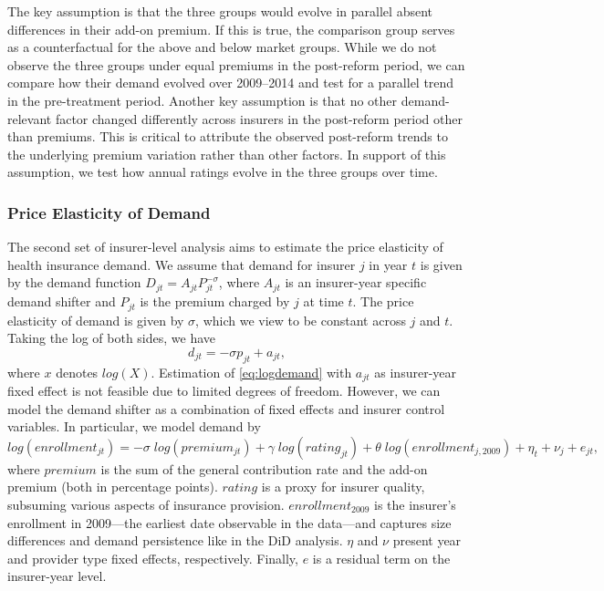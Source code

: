 \documentclass[a4paper, 11pt, english]{article}
\begin{document}
The key assumption is that the three groups would evolve in parallel absent differences in their add-on premium. If this is true, the comparison group serves as a counterfactual for the above and below market groups. While we do not observe the three groups under equal premiums in the post-reform period, we can compare how their demand evolved over 2009--2014 and test for a parallel trend in the pre-treatment period. Another key assumption is that no other demand-relevant factor changed differently across insurers in the post-reform period other than premiums. This is critical to attribute the observed post-reform trends to the underlying premium variation rather than other factors. In support of this assumption, we test how annual ratings evolve in the three groups over time.

\subsubsection*{Price Elasticity of Demand}

The second set of insurer-level analysis aims to estimate the price elasticity of health insurance demand. We assume that demand for insurer $j$ in year $t$ is given by the demand function $D_{jt} = A_{jt}P_{jt}^{-\sigma}$, where $A_{jt}$ is an insurer-year specific demand shifter and $P_{jt}$ is the premium charged by $j$ at time $t$. The price elasticity of demand is given by $\sigma$, which we view to be constant across $j$ and $t$. Taking the log of both sides, we have
\begin{equation}\label{eq:logdemand}
	d_{jt} = -\sigma p_{jt} + a_{jt},
\end{equation}
where $x$ denotes $log(X)$. Estimation of \eqref{eq:logdemand} with $a_{jt}$ as insurer-year fixed effect is not feasible due to limited degrees of freedom. However, we can model the demand shifter as a combination of fixed effects and insurer control variables. In particular, we model demand by
\begin{equation}\label{eq:aggregate_premium}
	log(enrollment_{jt}) = -\sigma \; log(premium_{jt}) + \gamma \; log(rating_{jt}) + \theta \; log(enrollment_{j,2009}) + \eta_t + \nu_j + e_{jt},
\end{equation}
where $premium$ is the sum of the general contribution rate and the add-on premium (both in percentage points). $rating$ is a proxy for insurer quality, subsuming various aspects of insurance provision. $enrollment_{2009}$ is the insurer's enrollment in 2009---the earliest date observable in the data---and captures size differences and demand persistence like in the DiD analysis. $\eta$ and $\nu$ present year and provider type fixed effects, respectively. Finally, $e$ is a residual term on the insurer-year level.
\end{document}
